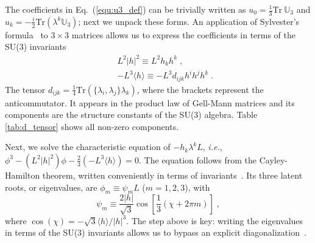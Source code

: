 \documentclass[final,5p,times,twocolumn]{elsarticle}
\newcommand{\ie}{{\it i.e.}}
\newcommand{\eq}{Eq.}
\newcommand{\equ}[1]{\eq~(\ref{equ:#1})}
\begin{document}
The coefficients in \equ{u3_def} can be trivially written as $u_0=\frac{1}{3}\text{Tr}~\mathbb{U}_3$ and $u_k=-\frac{i}{2}\text{Tr}(\lambda^k \mathbb{U}_3)$; next we unpack these forms.  An application of Sylvester's formula\ \cite{Sylvester:1883} to $3 \times 3$ matrices allows us to express the coefficients in terms of the SU(3) invariants
\begin{eqnarray*}
 \label{equ:def_I2}
 && L^2 \left\vert h \right\vert^2  \equiv L^2 h_kh^k \;, \\
 \label{equ:def_I3}
 && -L^3 \langle h \rangle \equiv -L^3 d_{ijk}h^ih^jh^k \;.
\end{eqnarray*}
The tensor $d_{ijk} = \frac{1}{4} \text{Tr} \left( \lbrace\lambda_i,\lambda_j\rbrace\lambda_k \right)$, where the brackets represent the anticommutator.  It appears in the product law of Gell-Mann matrices and its components are the structure constants of the SU(3) algebra.  Table \ref{tab:d_tensor} shows all non-zero components.

Next, we solve the characteristic equation of $-h_k\lambda^kL$, \ie, $\phi^3-(L^2 \left\vert h \right\vert^2) \phi-\frac{2}{3} (-L^3 \langle h \rangle)=0$.  The equation follows from the Cayley-Hamilton theorem, written conveniently in terms of invariants\ \cite{MacFarlane:1968vc, Curtright:2015iba}.  Its three latent roots, or eigenvalues, are $\phi_m \equiv \psi_m L$ ($m=1,2,3$), with
\begin{equation}
 \label{equ:phi_alpha}
 \psi_m
 \equiv
 \frac{2 \left\vert h \right\vert}{\sqrt{3}} \cos\left[\frac{1}{3}\left(\chi+2\pi m \right)\right] \;,
\end{equation}
where $\cos\left(\chi\right) = -\sqrt{3} \langle h \rangle / \lvert h \rvert^3$.  The step above is key: writing the eigenvalues in terms of the SU(3) invariants allows us to bypass an explicit diagonalization\ \cite{Curtright:2015iba}.
\end{document}
